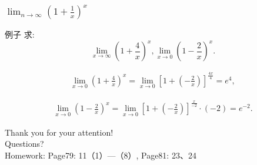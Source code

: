 \documentclass[
10pt,  
aspectratio=43,  
]{beamer}
\begin{document}
\begin{frame}
	\frametitle{$\lim_{n\to\infty}\left(1+\frac1x\right)^x$}
	\begin{exampleblock}{例子}
		求: $$
		\lim _{x \rightarrow \infty}\left(1+\frac{4}{x}\right)^x,   \lim _{x \rightarrow 0}\left(1-\frac{2}{x}\right)^x.
		$$
	\end{exampleblock}
	
	\begin{equation*}
		\begin{aligned}
			\lim _{x \rightarrow 0}\left(1+\frac{4}{x}\right)^x=\lim _{x \rightarrow 0}\left[1+\left(-\frac{2}{x}\right)\right]^{\frac{4x}{4}}=e^{4}, 
		\end{aligned}
	\end{equation*}
	
	
	\begin{equation*}
		\begin{aligned}
			\lim _{x \rightarrow 0}\left(1-\frac{2}{x}\right)^x=\lim _{x \rightarrow 0}\left[1+\left(-\frac{2}{x}\right)\right]^{\frac{x}{-2}} \cdot(-2)=e^{-2}. 
		\end{aligned}
	\end{equation*}
\end{frame}

\begin{frame}[plain]
	\vfill
	\centering
	{
		\centering \Huge \color{white} Thank you for your attention!\\[10pt]Questions?\\Homework: Page79:  11（1）—（8）,   Page81:  23、24
	}
	\vfill
\end{frame}
\end{document}
